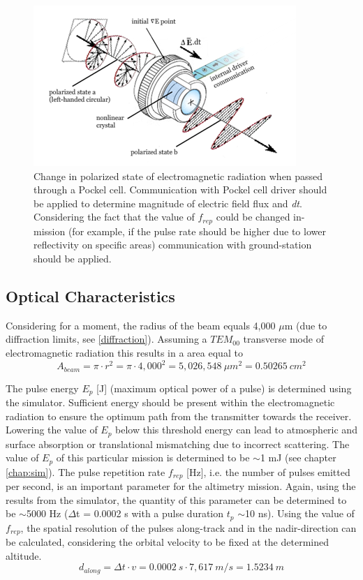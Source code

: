 \begin{figure} [ht]
\centering
\includegraphics[scale=1.2]{chapters/img/laser_polarized.png}	
\caption[Polarized state passed through a Pockel cell]{Change in polarized state of electromagnetic radiation when passed through a Pockel cell. Communication with Pockel cell driver should be applied to determine magnitude of electric field flux and \textit{dt}. Considering the fact that the value of $f_{rep}$ could be changed in-mission (for example, if the pulse rate should be higher due to lower reflectivity on specific areas) communication with ground-station should be applied.}
\label{fig:pockel_cell}
\end{figure}

\subsection{Optical Characteristics} 
\label{opticalchar}
Considering for a moment, the radius of the beam equals 4,000 $\mu$m (due to diffraction limits, see \ref{diffraction}). Assuming a $TEM_{00}$ transverse mode of electromagnetic radiation this results in a area equal to 
\begin{equation}
\label{area}
A_{beam} = \pi \cdot r^{2} = \pi \cdot 4,000^{2} = 5,026,548\ \mu m^{2} = 0.50265\ cm^{2}
\end{equation}

The pulse energy $E_{p}$ [J] (maximum optical power of a pulse) is determined using the simulator. Sufficient energy should be present within the electromagnetic radiation to ensure the optimum path from the transmitter towards the receiver. Lowering the value of $E_{p}$ below this threshold energy can lead to atmospheric and surface absorption or translational mismatching due to incorrect scattering. The value of $E_{p}$ of this particular mission is determined to be $\sim$1 mJ (see chapter \ref{chap:sim}).
The pulse repetition rate $f_{rep}$ [Hz], i.e. the number of pulses emitted per second, is an important parameter for the altimetry mission. Again, using the results from the simulator, the quantity of this parameter can be determined to be $\sim$5000 Hz ($\Delta$t = 0.0002 s with a pulse duration $t_{p}$ $\sim$10 ns). Using the value of $f_{rep}$, the spatial resolution of the pulses along-track and in the nadir-direction can be calculated, considering the orbital velocity to be fixed at the determined altitude.  
\begin{equation}
\label{alongtrackres}
d_{along} = \Delta t \cdot v = 0.0002\ s \cdot 7,617\ m/s = 1.5234\ m
\end{equation}

